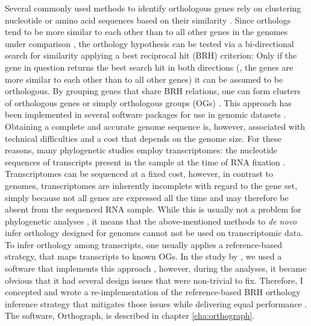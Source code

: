 Several commonly used methods to identify orthologous genes rely on
clustering nucleotide or amino acid sequences based on their similarity
\citep{Chen2007a}. Since orthologs tend to be more similar to each other
than to all other genes in the genomes under comparison
\citep{Altenhoff2012a}, the orthology hypothesis can be tested via a
bi-directional search for similarity applying a best reciprocal hit
(BRH) criterion: Only if the gene in question returns the best search
hit in both directions (\ie, the genes are more similar to each other
than to all other genes) it can be assumed to be orthologous. By
grouping genes that share BRH relations, one can form clusters of
orthologous genes or simply orthologous groups (OGs)
\citep{Altenhoff2012}. This approach has been implemented in several
software packages for use in genomic datasets \citep{Li2003,
Tatusov2003, Berglund2008, Zdobnov2017}. Obtaining a complete and
accurate genome sequence is, however, associated with technical
difficulties and a cost that depends on the genome size. For these
reasons, many phylogenetic studies employ transcriptomes: the nucleotide
sequences of transcripts present in the sample at the time of RNA
fixation \citep{Wang2009}. Transcriptomes can be sequenced at a fixed
cost, however, in contrast to genomes, transcriptomes are inherently
incomplete with regard to the gene set, simply because not all genes are
expressed all the time and may therefore be absent from the sequenced
RNA sample. While this is usually not a problem for phylogenetic
analyses \citep{Wiens2006}, it means that the above-mentioned methods to
\emph{de novo} infer orthology designed for genomes cannot not be used
on transcriptomic data. To infer orthology among transcripts, one
usually applies a reference-based strategy, that maps transcripts to
known OGs. In the study by \citet{Misof2014}, we used a software that
implements this approach \citep{Ebersberger2009}, however, during the
analyses, it became obvious that it had several design issues that were
non-trivial to fix. Therefore, I concepted and wrote a
re-implementation of the reference-based BRH orthology inference
strategy that mitigates those issues while delivering equal performance
\citep{Petersen2017}. The software, Orthograph, is described in chapter
\ref{cha:orthograph}.

